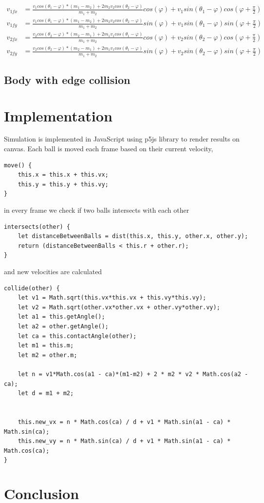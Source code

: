 \documentclass[]{report}
\begin{document}
\begin{equation}
\begin{aligned}
\label{eq:final_equation}
v_{1fx} &= \frac{v_1 cos(\theta_1 - \varphi)*(m_1-m_2) + 2m_2 v_2 cos(\theta_2 - \varphi)}{m_1+m_2} cos(\varphi) + v_1 sin(\theta_1 - \varphi) cos(\varphi + \frac{\pi}{2}) \\
v_{1fy} &= \frac{v_1 cos(\theta_1 - \varphi)*(m_1-m_2) + 2m_2 v_2 cos(\theta_2 - \varphi)}{m_1+m_2} sin(\varphi) + v_1 sin(\theta_1 - \varphi) sin(\varphi + \frac{\pi}{2}) \\
v_{2fx} &=\frac{v_2 cos(\theta_2 - \varphi)*(m_2-m_1) + 2m_1 v_1 cos(\theta_1 - \varphi)}{m_1+m_2} cos(\varphi) + v_2 sin(\theta_2 - \varphi) cos(\varphi + \frac{\pi}{2}) \\
v_{2fy} &= \frac{v_2 cos(\theta_2 - \varphi)*(m_2-m_1) + 2m_1 v_1 cos(\theta_1 - \varphi)}{m_1+m_2} sin(\varphi) + v_2 sin(\theta_2 - \varphi) sin(\varphi + \frac{\pi}{2}) 
\end{aligned}
\end{equation}
\subsection{Body with edge collision}
\section{Implementation}
Simulation is implemented in JavaScript using p5js library to render results on canvas. Each ball is moved each frame based on their current velocity,
\begin{lstlisting}
move() {
	this.x = this.x + this.vx;
	this.y = this.y + this.vy;
}
\end{lstlisting}
in every frame we check if two balls intersects with each other
\begin{lstlisting}
intersects(other) {
	let distanceBetweenBalls = dist(this.x, this.y, other.x, other.y);
	return (distanceBetweenBalls < this.r + other.r);
}
\end{lstlisting}
and new velocities are calculated
\begin{lstlisting}
collide(other) {
	let v1 = Math.sqrt(this.vx*this.vx + this.vy*this.vy);
	let v2 = Math.sqrt(other.vx*other.vx + other.vy*other.vy);
	let a1 = this.getAngle();
	let a2 = other.getAngle();
	let ca = this.contactAngle(other);
	let m1 = this.m;
	let m2 = other.m;
	
	let n = v1*Math.cos(a1 - ca)*(m1-m2) + 2 * m2 * v2 * Math.cos(a2 - ca);
	let d = m1 + m2;
	
	
	this.new_vx = n * Math.cos(ca) / d + v1 * Math.sin(a1 - ca) * Math.sin(ca);
	this.new_vy = n * Math.sin(ca) / d + v1 * Math.sin(a1 - ca) * Math.cos(ca);
}
\end{lstlisting}
\section{Conclusion}
\end{document}

